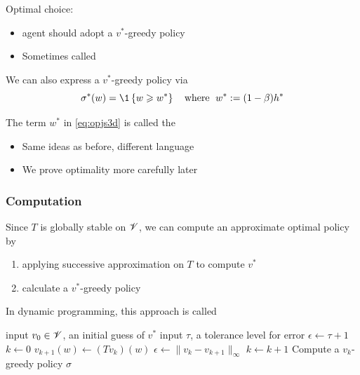 \begin{frame}
    
    Optimal choice:
    \begin{itemize}
        \item agent should adopt a $v^*$-greedy policy
            \vspace{0.5em}
        \item Sometimes called 
    \end{itemize}


    We can also express a $v^*$-greedy policy via
    \begin{equation}
        \label{eq:opjs3d}
        \sigma^*(w) 
        = \1
        \left\{
            w \geq w^*
        \right\}
        \quad \text{where } \;
        w^* := (1 - \beta) h^* 
    \end{equation}

    The term $w^*$ in \eqref{eq:opjs3d} is called the 

    \begin{itemize}
        \item Same ideas as before, different language
            \vspace{0.5em}
        \item We prove optimality more carefully later
    \end{itemize}

\end{frame}


\begin{frame}
    \frametitle{Computation}

    Since $T$ is globally stable on $\mathscr V$, we can compute an approximate
    optimal policy by 
    \begin{enumerate}
        \item applying successive approximation on $T$ to compute $v^*$
        \item calculate a $v^*$-greedy policy
    \end{enumerate}

    In dynamic programming, this approach is called 

\end{frame}



\begin{frame}

    {\small 
        \begin{algorithm}[H]
        \DontPrintSemicolon
        input $v_0 \in \mathscr V$, an initial guess of $v^*$ \;
        input $\tau$, a tolerance level for error \;
        $\epsilon \leftarrow \tau + 1$ \;
        $k \leftarrow 0$ \;
        \While{$\epsilon > \tau $}
        {
            {
                $v_{k+1}(w) \leftarrow (Tv_k) (w)$ \;
            }
            $\epsilon \leftarrow \| v_k - v_{k+1} \|_\infty$ \;
            $k \leftarrow k + 1$ \;
        }
        Compute a $v_k$-greedy policy $\sigma$ \;
        \Return{$\sigma$}
    \end{algorithm}
    }


\end{frame}


